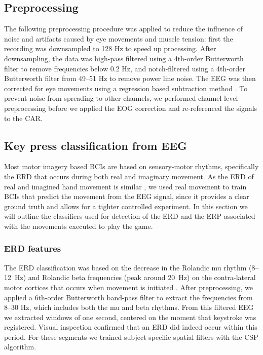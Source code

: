 \subsection{Preprocessing}
The following preprocessing procedure was applied to reduce the influence of
noise and artifacts caused by eye movements and muscle tension: first the
recording was downsampled to 128 Hz to speed up processing. After downsampling,
the data was high-pass filtered using a 4th-order Butterworth filter to remove
frequencies below 0.2 Hz, and notch-filtered using a 4th-order Butterworth
filter from 49--51 Hz to remove power line noise. The \ac{EEG} was then
corrected for eye movements using a regression  based subtraction
method \cite{schloegl2007fac}.
To prevent noise from spreading to other channels, we performed
channel-level preprocessing before we applied the \ac{EOG} correction and
re-referenced the signals to the \ac{CAR}.

\subsection{Key press classification from EEG}
\begin{sloppypar}
Most motor imagery based \acp{BCI} are based on sensory-motor rhythms,
specifically the \acf{ERD} that occurs during both real and imaginary movement.
As the \ac{ERD} of real and imagined hand movement is similar
\cite{mcfarland2000mbr}, we used real movement to train \acp{BCI} that predict
the movement from the \ac{EEG} signal, since it provides a clear ground truth
and allows for a tighter controlled experiment. In this section we will outline
the classifiers used for detection of the \ac{ERD} and the \ac{ERP} associated
with the movements executed to play the game.
\end{sloppypar}

\subsubsection{\protect\ac{ERD} features}
\begin{sloppypar}
The \ac{ERD} classification was based on the decrease in the Rolandic mu rhythm
(8--12~Hz) and Rolandic beta frequencies (peak around 20~Hz) on the
contra-lateral motor cortices that occurs when movement is initiated
\cite{pfurtscheller1999eem}.
% 
After preprocessing, we applied a 6th-order Butterworth band-pass filter to
extract the frequencies from 8--30 Hz, which includes both the mu and beta
rhythms. From this filtered \ac{EEG} we extracted windows of one second,
centered on the moment that keystroke was registered. Visual inspection
confirmed that an \ac{ERD} did indeed occur within this period. For these
segments we trained subject-specific spatial filters with the \ac{CSP}
algorithm.
\end{sloppypar}

